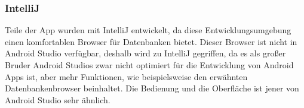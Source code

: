 \documentclass[FIPLY_base.tex]{subfiles}
\begin{document}
\subsubsection{IntelliJ}
Teile der App wurden mit IntelliJ entwickelt, da diese Entwicklungsumgebung einen komfortablen Browser für Datenbanken bietet.
Dieser Browser ist nicht in Android Studio verfügbar, deshalb wird zu IntelliJ gegriffen, da es als großer Bruder Android Studios zwar nicht optimiert für die Entwicklung von Android Apps ist, aber mehr Funktionen, wie beispielsweise den erwähnten Datenbankenbrowser beinhaltet. %
Die Bedienung und die Oberfläche ist jener von Android Studio sehr ähnlich. 
\end{document}
